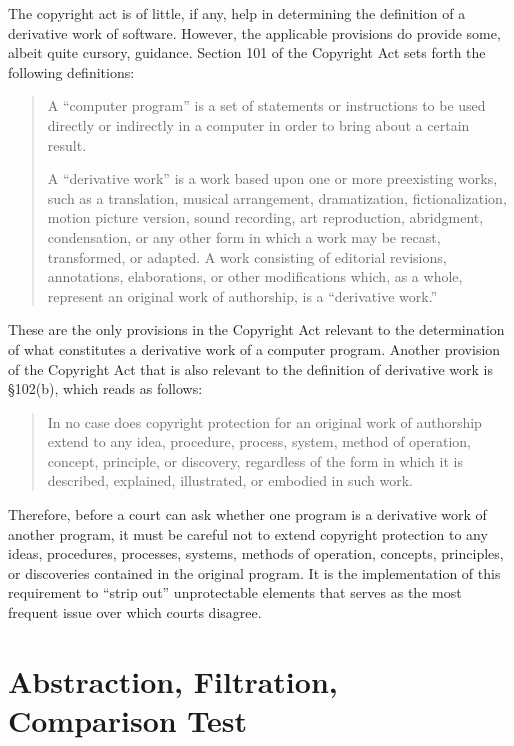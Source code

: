 The copyright act is of little, if any, help in determining the definition
of a derivative work of software. However, the applicable provisions do
provide some, albeit quite cursory, guidance. Section 101 of the Copyright
Act sets forth the following definitions:

\begin{quotation}
A ``computer program'' is a set of statements or instructions to be used
directly or indirectly in a computer in order to bring about a certain
result.

A ``derivative work'' is a work based upon one or more preexisting works,
such as a translation, musical arrangement, dramatization,
fictionalization, motion picture version, sound recording, art
reproduction, abridgment, condensation, or any other form in which a work
may be recast, transformed, or adapted. A work consisting of editorial
revisions, annotations, elaborations, or other modifications which, as a
whole, represent an original work of authorship, is a ``derivative work.''
\end{quotation}

These are the only provisions in the Copyright Act relevant to the
determination of what constitutes a derivative work of a computer
program. Another provision of the Copyright Act that is also relevant to
the definition of derivative work is \S 102(b), which reads as follows:

\begin{quotation}
In no case does copyright protection for an original work of authorship
extend to any idea, procedure, process, system, method of operation,
concept, principle, or discovery, regardless of the form in which it is
described, explained, illustrated, or embodied in such work.
\end{quotation}

Therefore, before a court can ask whether one program is a derivative work
of another program, it must be careful not to extend copyright protection
to any ideas, procedures, processes, systems, methods of operation,
concepts, principles, or discoveries contained in the original program. It
is the implementation of this requirement to ``strip out'' unprotectable
elements that serves as the most frequent issue over which courts
disagree.

\section{Abstraction, Filtration, Comparison Test}

